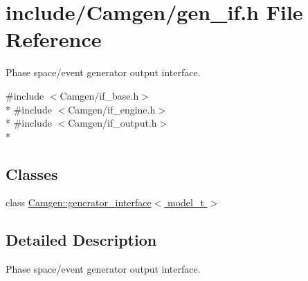 \hypertarget{a00652}{}\section{include/\+Camgen/gen\+\_\+if.h File Reference}
\label{a00652}


Phase space/event generator output interface.  


{\ttfamily \#include $<$Camgen/if\+\_\+base.\+h$>$}\\*
{\ttfamily \#include $<$Camgen/if\+\_\+engine.\+h$>$}\\*
{\ttfamily \#include $<$Camgen/if\+\_\+output.\+h$>$}\\*
\subsection*{Classes}
\begin{DoxyCompactItemize}
\item 
class \hyperlink{a00242}{Camgen\+::generator\+\_\+interface$<$ model\+\_\+t $>$}
\end{DoxyCompactItemize}


\subsection{Detailed Description}
Phase space/event generator output interface. 

